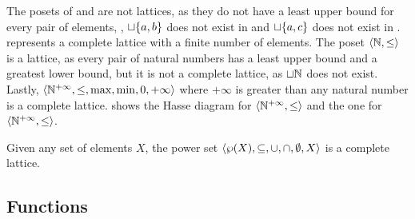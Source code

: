 \begin{example}
  The posets of  and  are not lattices, as they do not have a least upper bound for every pair of elements, \eg, $\sqcup\{a, b\}$ does not exist in  and $\sqcup\{a, c\}$ does not exist in .
%
   represents a complete lattice with a finite number of elements.
  The poset $\langle \mathbb{N}, \le \rangle$ is a lattice, as every pair of natural numbers has a least upper bound and a greatest lower bound, but it is not a complete lattice, as $\sqcup \mathbb{N}$ does not exist.
  Lastly, $\langle \mathbb{N}^{+\infty}, \le, \max, \min, 0, +\infty \rangle$ where $+\infty$ is greater than any natural number is a complete lattice.
   shows the Hasse diagram for $\langle \mathbb{N}^{+\infty}, \le \rangle$ and  the one for $\langle \mathbb{N}^{+\infty}, \le \rangle$.
\end{example}

\begin{remark}
  Given any set of elements $X$, the power set $\langle \wp(X), \subseteq, \cup, \cap, \emptyset, X \rangle$ is a complete lattice.
\end{remark}


\subsection{Functions}



